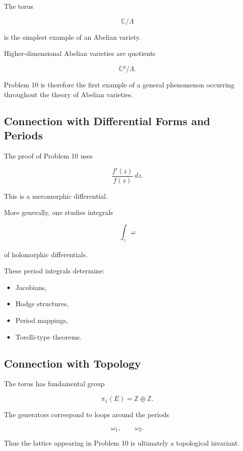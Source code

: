 \documentclass[12pt,a4paper]{article}
\theoremstyle{notespace}
\begin{document}
The torus

\[
\mathbb C/\Lambda
\]

is the simplest example of an Abelian variety.

Higher-dimensional Abelian varieties are quotients

\[
\mathbb C^g/\Lambda.
\]

Problem 10 is therefore the first example of a general phenomenon occurring throughout the theory of Abelian varieties.

\subsection{Connection with Differential Forms and Periods}

The proof of Problem 10 uses

\[
\frac{f'(z)}{f(z)}\,dz.
\]

This is a meromorphic differential.

More generally, one studies integrals

\[
\int_\gamma \omega
\]

of holomorphic differentials.

These period integrals determine:

\begin{itemize}
	\item Jacobians,
	\item Hodge structures,
	\item Period mappings,
	\item Torelli-type theorems.
\end{itemize}

\subsection{Connection with Topology}

The torus has fundamental group

\[
\pi_1(E)
=
\mathbb Z\oplus\mathbb Z.
\]

The generators correspond to loops around the periods

\[
\omega_1,
\qquad
\omega_2.
\]

Thus the lattice appearing in Problem 10 is ultimately a topological invariant.

\begin{center}
\end{center}
\end{document}
